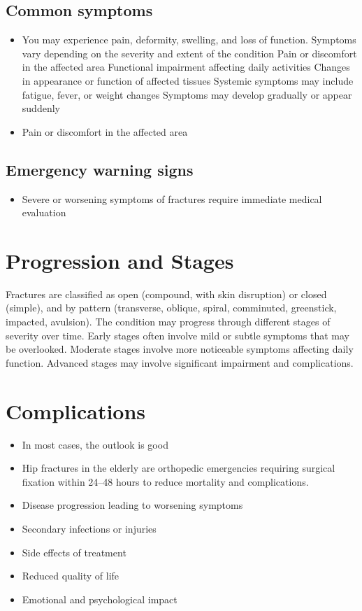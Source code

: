 \subsection{Common symptoms}
\begin{itemize}[noitemsep]
  \item You may experience pain, deformity, swelling, and loss of function. Symptoms vary depending on the severity and extent of the condition Pain or discomfort in the affected area Functional impairment affecting daily activities Changes in appearance or function of affected tissues Systemic symptoms may include fatigue, fever, or weight changes Symptoms may develop gradually or appear suddenly
  \item Pain or discomfort in the affected area
  \end{itemize}

\subsection{Emergency warning signs}
\begin{itemize}[noitemsep]
  \item Severe or worsening symptoms of fractures require immediate medical evaluation
\end{itemize}
\section{Progression and Stages}
Fractures are classified as open (compound, with skin disruption) or closed (simple), and by pattern (transverse, oblique, spiral, comminuted, greenstick, impacted, avulsion). The condition may progress through different stages of severity over time. Early stages often involve mild or subtle symptoms that may be overlooked. Moderate stages involve more noticeable symptoms affecting daily function. Advanced stages may involve significant impairment and complications.
\section{Complications}
\begin{itemize}[noitemsep]
  \item In most cases, the outlook is good
  \item Hip fractures in the elderly are orthopedic emergencies requiring surgical fixation within 24--48 hours to reduce mortality and complications.
  \item Disease progression leading to worsening symptoms
  \item Secondary infections or injuries
  \item Side effects of treatment
  \item Reduced quality of life
  \item Emotional and psychological impact
\end{itemize}
